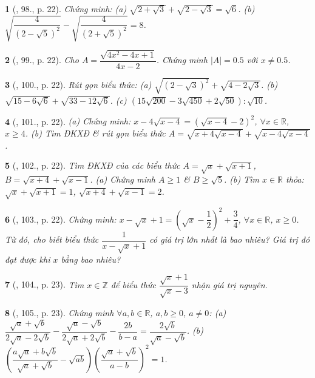 \documentclass{article}
\newtheorem{baitoan}{}%
\begin{document}
\begin{baitoan}[\cite{SBT_Toan_9_tap_1}, 98., p. 22]
	Chứng minh: (a) $\sqrt{2 + \sqrt{3}} + \sqrt{2 - \sqrt{3}} = \sqrt{6}$. (b) $\sqrt{\dfrac{4}{(2 - \sqrt{5})^2}} - \sqrt{\dfrac{4}{(2 + \sqrt{5})^2}} = 8$.
\end{baitoan}

\begin{baitoan}[\cite{SBT_Toan_9_tap_1}, 99., p. 22]
	Cho $A = \dfrac{\sqrt{4x^2 - 4x + 1}}{4x - 2}$. Chứng minh $|A| = 0.5$ với $x\ne0.5$.
\end{baitoan}

\begin{baitoan}[\cite{SBT_Toan_9_tap_1}, 100., p. 22]
	Rút gọn biểu thức: (a) $\sqrt{(2 - \sqrt{3})^2} + \sqrt{4 - 2\sqrt{3}}$. (b) $\sqrt{15 - 6\sqrt{6}} + \sqrt{33 - 12\sqrt{6}}$. (c) $(15\sqrt{200} - 3\sqrt{450} + 2\sqrt{50}):\sqrt{10}$.
\end{baitoan}

\begin{baitoan}[\cite{SBT_Toan_9_tap_1}, 101., p. 22]
	(a) Chứng minh: $x - 4\sqrt{x - 4} = (\sqrt{x - 4} - 2)^2$, $\forall x\in\mathbb{R}$, $x\ge4$. (b) Tìm ĐKXĐ \& rút gọn biểu thức $A = \sqrt{x + 4\sqrt{x - 4}} + \sqrt{x - 4\sqrt{x - 4}}$.
\end{baitoan}

\begin{baitoan}[\cite{SBT_Toan_9_tap_1}, 102., p. 22]
	Tìm ĐKXĐ của các biểu thức $A = \sqrt{x} + \sqrt{x + 1}$, $B = \sqrt{x + 4} + \sqrt{x - 1}$. (a) Chứng minh $A\ge1$ \& $B\ge\sqrt{5}$. (b) Tìm $x\in\mathbb{R}$ thỏa: $\sqrt{x} + \sqrt{x + 1} = 1$, $\sqrt{x + 4} + \sqrt{x - 1} = 2$.
\end{baitoan}

\begin{baitoan}[\cite{SBT_Toan_9_tap_1}, 103., p. 22]
	Chứng minh: $x - \sqrt{x} + 1 = \left(\sqrt{x} - \dfrac{1}{2}\right)^2 + \dfrac{3}{4}$, $\forall x\in\mathbb{R}$, $x\ge0$. Từ đó, cho biết biểu thức $\dfrac{1}{x - \sqrt{x} + 1}$ có giá trị lớn nhất là bao nhiêu? Giá trị đó đạt được khi $x$ bằng bao nhiêu?
\end{baitoan}

\begin{baitoan}[\cite{SBT_Toan_9_tap_1}, 104., p. 23]
	Tìm $x\in\mathbb{Z}$ để biểu thức $\dfrac{\sqrt{x} + 1}{\sqrt{x} - 3}$ nhận giá trị nguyên.
\end{baitoan}

\begin{baitoan}[\cite{SBT_Toan_9_tap_1}, 105., p. 23]
	Chứng minh $\forall a,b\in\mathbb{R}$, $a,b\ge0$, $a\ne0$: (a) $\dfrac{\sqrt{a} + \sqrt{b}}{2\sqrt{a} - 2\sqrt{b}} - \dfrac{\sqrt{a} - \sqrt{b}}{2\sqrt{a} + 2\sqrt{b}} - \dfrac{2b}{b - a} = \dfrac{2\sqrt{b}}{\sqrt{a} - \sqrt{b}}$. (b) $\left(\dfrac{a\sqrt{a} + b\sqrt{b}}{\sqrt{a} + \sqrt{b}} - \sqrt{ab}\right)\left(\dfrac{\sqrt{a} + \sqrt{b}}{a - b}\right)^2 = 1$.
\end{baitoan}
\end{document}
